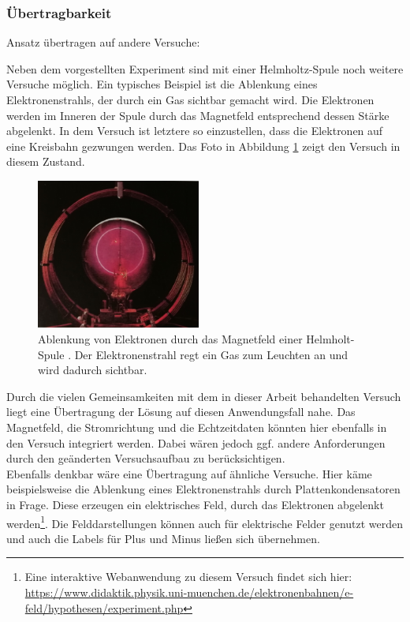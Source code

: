 \subsubsection{Übertragbarkeit}
Ansatz übertragen auf andere Versuche:

Neben dem vorgestellten Experiment sind mit einer Helmholtz-Spule noch weitere Versuche möglich. Ein typisches Beispiel ist die Ablenkung eines Elektronenstrahls, der durch ein Gas sichtbar gemacht wird. Die Elektronen werden im Inneren der Spule durch das Magnetfeld entsprechend dessen Stärke abgelenkt. In dem Versuch ist letztere so einzustellen, dass die Elektronen auf eine Kreisbahn gezwungen werden. Das Foto in Abbildung \ref{img:beam} zeigt den Versuch in diesem Zustand.\\

\begin{figure}
	\centering
	\includegraphics[width=0.48\textwidth]{images/papers/beam.jpg}
	\caption{Ablenkung von Elektronen durch das Magnetfeld einer Helmholt-Spule \cite{Bader15}. Der Elektronenstrahl regt ein Gas zum Leuchten an und wird dadurch sichtbar.}
	\label{img:beam}
\end{figure}

Durch die vielen Gemeinsamkeiten mit dem in dieser Arbeit behandelten Versuch liegt eine Übertragung der Lösung auf diesen Anwendungsfall nahe. Das Magnetfeld, die Stromrichtung und die Echtzeitdaten könnten hier ebenfalls in den Versuch integriert werden. Dabei wären jedoch ggf. andere Anforderungen durch den geänderten Versuchsaufbau zu berücksichtigen.\\

Ebenfalls denkbar wäre eine Übertragung auf ähnliche Versuche. Hier käme beispielsweise die Ablenkung eines Elektronenstrahls durch Plattenkondensatoren in Frage. Diese erzeugen ein elektrisches Feld, durch das Elektronen abgelenkt werden\footnote{Eine interaktive Webanwendung zu diesem Versuch findet sich hier: \url{https://www.didaktik.physik.uni-muenchen.de/elektronenbahnen/e-feld/hypothesen/experiment.php}}. Die Felddarstellungen können auch für elektrische Felder genutzt werden und auch die Labels für Plus und Minus ließen sich übernehmen.\\

